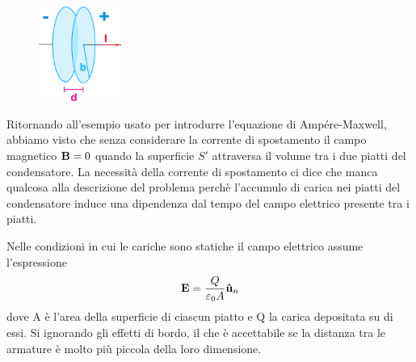 \begin{figure}  %
    \centering
    \includegraphics[width=0.24\textwidth]{images/parallel_plate} %
\end{figure}
Ritornando all'esempio usato per introdurre l'equazione di Amp\'ere-Maxwell, abbiamo visto che senza considerare la corrente di spostamento il campo magnetico $\bold{B} = 0$ quando la superficie $S'$ attraversa il volume tra i due piatti del condensatore. La necessit\`a della corrente di spostamento ci dice che manca qualcosa alla descrizione del problema perch\`e l'accumulo di carica nei piatti del condensatore induce una dipendenza dal tempo del campo elettrico presente tra i piatti.

Nelle condizioni in cui le cariche sono statiche il campo elettrico assume l'espressione
\begin{equation*}
	\bold{E} = \frac{Q}{\varepsilon_0 A}\bold{\hat{u}}_n
\end{equation*}
dove A \`e l'area della superficie di ciascun piatto e Q la carica depositata su di essi. Si ignorando gli effetti di bordo, il che \`e accettabile se la distanza tra le armature \`e molto pi\`u piccola della loro dimensione.

